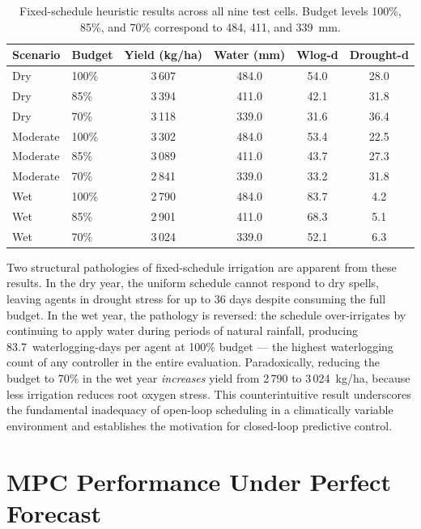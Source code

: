 \begin{table}[ht]
\centering
\caption{Fixed-schedule heuristic results across all nine test cells.
         Budget levels 100\%, 85\%, and 70\% correspond to 484, 411, and 339~mm.}
\label{tab:fixed_schedule}
\begin{tabular}{llcccc}
\hline
\textbf{Scenario} & \textbf{Budget} & \textbf{Yield (kg/ha)} & \textbf{Water (mm)} & \textbf{Wlog-d} & \textbf{Drought-d} \\
\hline
Dry      & 100\% & 3\,607 & 484.0 & 54.0 & 28.0 \\
Dry      & 85\%  & 3\,394 & 411.0 & 42.1 & 31.8 \\
Dry      & 70\%  & 3\,118 & 339.0 & 31.6 & 36.4 \\
Moderate & 100\% & 3\,302 & 484.0 & 53.4 & 22.5 \\
Moderate & 85\%  & 3\,089 & 411.0 & 43.7 & 27.3 \\
Moderate & 70\%  & 2\,841 & 339.0 & 33.2 & 31.8 \\
Wet      & 100\% & 2\,790 & 484.0 & 83.7 &  4.2 \\
Wet      & 85\%  & 2\,901 & 411.0 & 68.3 &  5.1 \\
Wet      & 70\%  & 3\,024 & 339.0 & 52.1 &  6.3 \\
\hline
\end{tabular}
\end{table}

Two structural pathologies of fixed-schedule irrigation are apparent from these results.
In the dry year, the uniform schedule cannot respond to dry spells, leaving agents in
drought stress for up to 36 days despite consuming the full budget.
In the wet year, the pathology is reversed: the schedule over-irrigates by continuing
to apply water during periods of natural rainfall, producing 83.7~waterlogging-days per
agent at 100\% budget — the highest waterlogging count of any controller in the
entire evaluation.  Paradoxically, reducing the budget to 70\% in the wet year
\emph{increases} yield from 2\,790 to 3\,024~kg/ha, because less irrigation reduces
root oxygen stress.  This counterintuitive result underscores the fundamental
inadequacy of open-loop scheduling in a climatically variable environment and
establishes the motivation for closed-loop predictive control.

\section{MPC Performance Under Perfect Forecast}
\label{sec:mpc}

